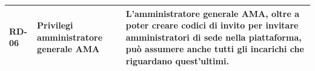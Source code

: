 \begin{center}
\begin{longtable}{|p{1.8cm}|p{3.2cm}|p{9.0cm}|}
\textbf{RD-06} & Privilegi amministratore generale AMA & L'amministratore generale AMA, oltre a poter creare codici di invito per invitare amministratori di sede nella piattaforma, può assumere anche tutti gli incarichi che riguardano quest'ultimi. \\ \hline
\end{longtable}
\end{center}
